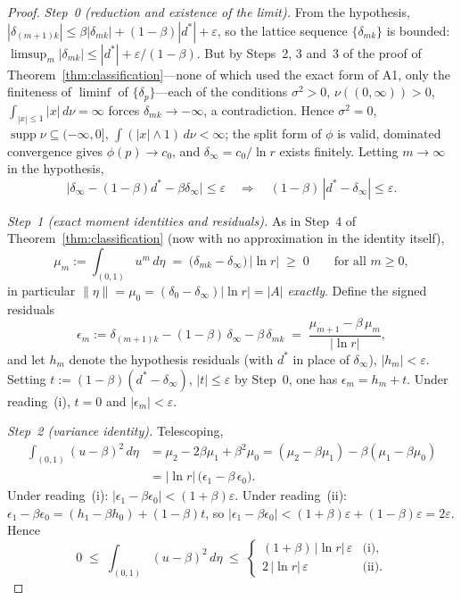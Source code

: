 \documentclass[12pt]{amsart}
\theoremstyle{definition}
\theoremstyle{remark}
\DeclareMathOperator{\supp}{supp}
\begin{document}
\begin{proof}
\textit{Step~0 (reduction and existence of the limit).}  From the
hypothesis, $|\delta_{(m+1)k}| \le \beta|\delta_{mk}| +
(1-\beta)|d^*| + \varepsilon$, so the lattice sequence
$\{\delta_{mk}\}$ is bounded:
$\limsup_m |\delta_{mk}| \le |d^*| + \varepsilon/(1-\beta)$.  But by
Steps~2, 3 and~3\textonehalf{} of the proof of
Theorem~\ref{thm:classification}---none of which used the exact
form of A1, only the finiteness of $\liminf$ of
$\{\delta_p\}$---each of the conditions $\sigma^2 > 0$,
$\nu((0,\infty)) > 0$, $\int_{|x|\le1}|x|\,d\nu = \infty$ forces
$\delta_{mk} \to -\infty$, a contradiction.  Hence $\sigma^2 = 0$,
$\supp\nu \subseteq (-\infty,0]$, $\int(|x|\wedge1)\,d\nu < \infty$;
the split form of $\phi$ is valid, dominated convergence gives
$\phi(p) \to c_0$, and $\delta_\infty = c_0/\ln r$ exists finitely.
Letting $m \to \infty$ in the hypothesis,
\[
  \bigl|\delta_\infty - (1-\beta)d^* - \beta\delta_\infty\bigr|
  \le \varepsilon
  \quad\Longrightarrow\quad
  (1-\beta)\,|d^* - \delta_\infty| \le \varepsilon .
\]

\textit{Step~1 (exact moment identities and residuals).}  As in
Step~4 of Theorem~\ref{thm:classification} (now with no
approximation in the identity itself),
\[
  \mu_m := \int_{(0,1)} u^m\,d\eta
  \;=\; \bigl(\delta_{mk} - \delta_\infty\bigr)\,|\ln r|
  \;\ge\; 0
  \qquad\text{for all } m \ge 0,
\]
in particular $\|\eta\| = \mu_0 = (\delta_0 - \delta_\infty)|\ln r| =
|A|$ \emph{exactly}.  Define the signed residuals
\[
  \epsilon_m := \delta_{(m+1)k} - (1-\beta)\,\delta_\infty
  - \beta\,\delta_{mk}
  \;=\; \frac{\mu_{m+1} - \beta\,\mu_m}{|\ln r|},
\]
and let $h_m$ denote the hypothesis residuals (with $d^*$ in place
of $\delta_\infty$), $|h_m| < \varepsilon$.  Setting
$t := (1-\beta)(d^* - \delta_\infty)$, $|t| \le \varepsilon$ by
Step~0, one has $\epsilon_m = h_m + t$.  Under reading~(i), $t = 0$
and $|\epsilon_m| < \varepsilon$.

\textit{Step~2 (variance identity).}  Telescoping,
\[
\begin{aligned}
  \int_{(0,1)} (u-\beta)^2\,d\eta
  &= \mu_2 - 2\beta\mu_1 + \beta^2\mu_0
  = (\mu_2 - \beta\mu_1) - \beta(\mu_1 - \beta\mu_0)\\
  &= |\ln r|\,\bigl(\epsilon_1 - \beta\,\epsilon_0\bigr).
\end{aligned}
\]
Under reading~(i): $|\epsilon_1 - \beta\epsilon_0| < (1+\beta)
\varepsilon$.  Under reading~(ii):
$\epsilon_1 - \beta\epsilon_0 = (h_1 - \beta h_0) + (1-\beta)t$, so
$|\epsilon_1 - \beta\epsilon_0| < (1+\beta)\varepsilon +
(1-\beta)\varepsilon = 2\varepsilon$.  Hence
\[
  0 \;\le\; \int_{(0,1)}(u-\beta)^2\,d\eta
  \;\le\;
  \begin{cases}
    (1+\beta)\,|\ln r|\,\varepsilon & \text{(i)},\\[2pt]
    2\,|\ln r|\,\varepsilon & \text{(ii)}.
  \end{cases}
\]


\end{proof}
\end{document}
